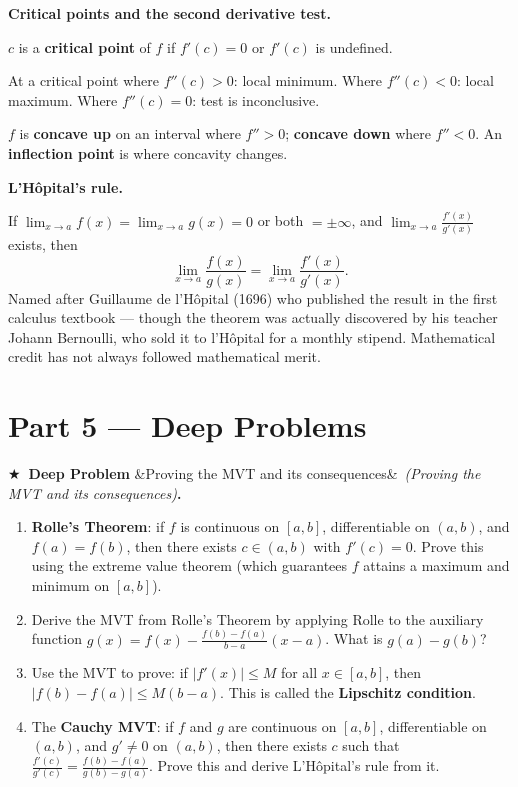\documentclass[12pt, a4paper]{article}
\newcounter{problem}
\newcounter{deepproblem}
\newenvironment{deepproblem}[1][]{%
  \refstepcounter{deepproblem}%
  \par\vspace{6pt}%
  \noindent\textbf{\color{NavyBlue}$\bigstar$\ Deep Problem \thedeepproblem}%
  \ifx&#1&\else\ \textit{(#1)}\fi\textbf{.}\enskip
}{\par\vspace{4pt}}
\begin{document}
\begin{namebox}
\textbf{Critical points and the second derivative test.}

$c$ is a \textbf{critical point} of $f$ if $f'(c) = 0$ or $f'(c)$ is undefined.

At a critical point where $f''(c) > 0$: local minimum. Where $f''(c) < 0$: local maximum. Where $f''(c) = 0$: test is inconclusive.

$f$ is \textbf{concave up} on an interval where $f'' > 0$; \textbf{concave down} where $f'' < 0$. An \textbf{inflection point} is where concavity changes.
\end{namebox}

\begin{namebox}
\textbf{L'H\^{o}pital's rule.}

If $\lim_{x\to a}f(x) = \lim_{x\to a}g(x) = 0$ or both $= \pm\infty$, and $\lim_{x\to a}\frac{f'(x)}{g'(x)}$ exists, then
\[
  \lim_{x\to a}\frac{f(x)}{g(x)} = \lim_{x\to a}\frac{f'(x)}{g'(x)}.
\]
Named after Guillaume de l'H\^{o}pital (1696) who published the result in the first calculus textbook --- though the theorem was actually discovered by his teacher Johann Bernoulli, who sold it to l'H\^{o}pital for a monthly stipend. Mathematical credit has not always followed mathematical merit.
\end{namebox}

\section{Part 5 \texorpdfstring{---}{--} Deep Problems}

\begin{deepproblem}[Proving the MVT and its consequences]
\begin{enumerate}[label=(\alph*)]
  \item \textbf{Rolle's Theorem}: if $f$ is continuous on $[a,b]$, differentiable on $(a,b)$, and $f(a) = f(b)$, then there exists $c\in(a,b)$ with $f'(c) = 0$. Prove this using the extreme value theorem (which guarantees $f$ attains a maximum and minimum on $[a,b]$).
  \item Derive the MVT from Rolle's Theorem by applying Rolle to the auxiliary function $g(x) = f(x) - \frac{f(b)-f(a)}{b-a}(x-a)$. What is $g(a) - g(b)$?
  \item Use the MVT to prove: if $|f'(x)| \leq M$ for all $x \in [a,b]$, then $|f(b)-f(a)| \leq M(b-a)$. This is called the \textbf{Lipschitz condition}.
  \item The \textbf{Cauchy MVT}: if $f$ and $g$ are continuous on $[a,b]$, differentiable on $(a,b)$, and $g'\neq 0$ on $(a,b)$, then there exists $c$ such that $\frac{f'(c)}{g'(c)} = \frac{f(b)-f(a)}{g(b)-g(a)}$. Prove this and derive L'H\^{o}pital's rule from it.
\end{enumerate}
\end{deepproblem}
\end{document}
